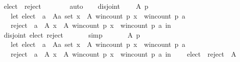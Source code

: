 \begin{isabellebody}
\ \ \ \ elect\ {\isasyminter}\ reject\ {\isacharequal}{\kern0pt}\ {\isacharbraceleft}{\kern0pt}{\isacharbraceright}{\kern0pt}{\isachardoublequoteclose}\isanewline
\ \ \ \ \isamarkupfalse%
\ auto\isanewline
\ \ \isamarkupfalse%
\ disjoint{\isacharcolon}{\kern0pt}\isanewline
\ \ \ \ {\isachardoublequoteopen}{\isasymforall}A\ p{\isachardot}{\kern0pt}\isanewline
\ \ \ \ \ \ let\ elect\ {\isacharequal}{\kern0pt}\ {\isacharbraceleft}{\kern0pt}a\ {\isasymin}\ {\isacharparenleft}{\kern0pt}A{\isacharcolon}{\kern0pt}{\isacharcolon}{\kern0pt}{\isacharprime}{\kern0pt}a\ set{\isacharparenright}{\kern0pt}{\isachardot}{\kern0pt}\ {\isasymforall}x\ {\isasymin}\ A{\isachardot}{\kern0pt}\ win{\isacharunderscore}{\kern0pt}count\ p\ x\ {\isasymle}\ win{\isacharunderscore}{\kern0pt}count\ p\ a{\isacharbraceright}{\kern0pt}{\isacharsemicolon}{\kern0pt}\isanewline
\ \ \ \ \ \ reject\ {\isacharequal}{\kern0pt}\ {\isacharbraceleft}{\kern0pt}a\ {\isasymin}\ A{\isachardot}{\kern0pt}\ {\isasymexists}x\ {\isasymin}\ A{\isachardot}{\kern0pt}\ win{\isacharunderscore}{\kern0pt}count\ p\ x\ {\isachargreater}{\kern0pt}\ win{\isacharunderscore}{\kern0pt}count\ p\ a{\isacharbraceright}{\kern0pt}\ in\isanewline
\ \ \ \ disjoint{}\ {\isacharparenleft}{\kern0pt}elect{\isacharcomma}{\kern0pt}\ reject{\isacharcomma}{\kern0pt}\ {\isacharbraceleft}{\kern0pt}{\isacharbraceright}{\kern0pt}{\isacharparenright}{\kern0pt}{\isachardoublequoteclose}\isanewline
\ \ \ \ \isamarkupfalse%
\ simp\isanewline
\ \ \isamarkupfalse%
\isanewline
\ \ \ \ {\isachardoublequoteopen}{\isasymforall}A\ p{\isachardot}{\kern0pt}\isanewline
\ \ \ \ \ \ let\ elect\ {\isacharequal}{\kern0pt}\ {\isacharbraceleft}{\kern0pt}a\ {\isasymin}\ {\isacharparenleft}{\kern0pt}A{\isacharcolon}{\kern0pt}{\isacharcolon}{\kern0pt}{\isacharprime}{\kern0pt}a\ set{\isacharparenright}{\kern0pt}{\isachardot}{\kern0pt}\ {\isasymforall}x\ {\isasymin}\ A{\isachardot}{\kern0pt}\ win{\isacharunderscore}{\kern0pt}count\ p\ x\ {\isasymle}\ win{\isacharunderscore}{\kern0pt}count\ p\ a{\isacharbraceright}{\kern0pt}{\isacharsemicolon}{\kern0pt}\isanewline
\ \ \ \ \ \ reject\ {\isacharequal}{\kern0pt}\ {\isacharbraceleft}{\kern0pt}a\ {\isasymin}\ A{\isachardot}{\kern0pt}\ {\isasymexists}x\ {\isasymin}\ A{\isachardot}{\kern0pt}\ win{\isacharunderscore}{\kern0pt}count\ p\ x\ {\isachargreater}{\kern0pt}\ win{\isacharunderscore}{\kern0pt}count\ p\ a{\isacharbraceright}{\kern0pt}\ in\isanewline
\ \ \ \ elect\ {\isasymunion}\ reject\ {\isacharequal}{\kern0pt}\ A{\isachardoublequoteclose}\isanewline

\end{isabellebody}
